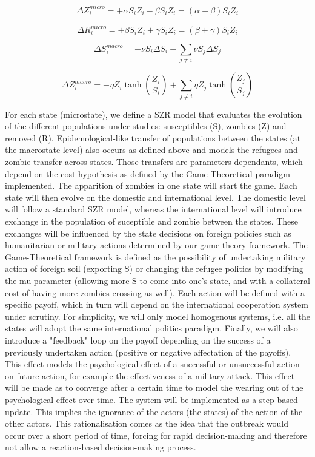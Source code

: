 \documentclass[11pt]{article}
\begin{document}
\begin{equation}
\Delta Z_{i}^{micro} = +\alpha S_{i} Z_{i} - \beta S_{i} Z_{i} = (\alpha - \beta) S_{i} Z_{i}
\end{equation}

\begin{equation}
\Delta R_{i}^{micro} = +\beta S_{i} Z_{i} + \gamma S_{i} Z_{i} = (\beta + \gamma) S_{i} Z_{i}
\end{equation}

\begin{equation}
\Delta S_{i}^{macro} = -\nu S_{i} \Delta S_{i} + \sum_{j\neq i}{\nu S_{j} \Delta S_{j}}
\end{equation}

\begin{equation}
\Delta Z_{i}^{macro} = -\eta Z_{i}\tanh (\frac{Z_{i}}{S_{i}}) + \sum_{j\neq i}{\eta Z_{j}\tanh (\frac{Z_{j}}{S_{j}})}
\end{equation}

For each state (microstate), we define a SZR model that evaluates the evolution of the different populations under studies: susceptibles (S), zombies (Z) and removed (R). Epidemological-like transfer of populations between the states (at the macrostate level) also occurs as defined above and models the refugees and zombie transfer across states. Those transfers are parameters dependants, which depend on the cost-hypothesis as defined by the Game-Theoretical paradigm implemented. The apparition of zombies in one state will start the game. Each state will then evolve on the domestic and international level. The domestic level will follow a standard SZR model, whereas the international level will introduce exchange in the population of suceptible and zombie between the states. These exchanges will be influenced by the state decisions on foreign policies such as humanitarian or military actions determined by our game theory framework. The Game-Theoretical framework is defined as the possibility of undertaking military action of foreign soil (exporting S) or changing the refugee politics by modifying the mu parameter (allowing more S to come into one's state, and with a collateral cost of having more zombies crossing as well). Each action will be defined with a specific payoff, which in turn will depend on the international cooperation system under scrutiny. For simplicity, we will only model homogenous systems, i.e. all the states will adopt the same international politics paradigm. Finally, we will also introduce a "feedback" loop on the payoff depending on the success of a previously undertaken action (positive or negative affectation of the payoffs). This effect models the psychological effect of a successful or unsuccessful action on future action, for example the effectiveness of a military attack. This effect will be made as to converge after a certain time to model the wearing out of the psychological effect over time. The system will be implemented as a step-based update. This implies the ignorance of the actors (the states) of the action of the other actors. This rationalisation comes as the idea that the outbreak would occur over a short period of time, forcing for rapid decision-making and therefore not allow a reaction-based decision-making process. 
\end{document}
